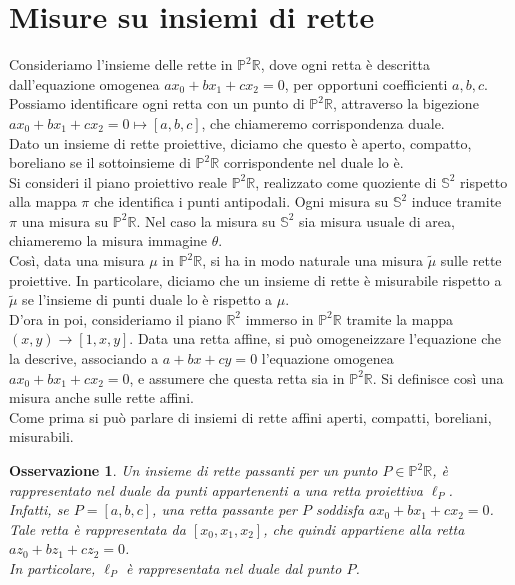 \documentclass[a4paper, twoside,openright]{article}
\newcommand{\ra}{\rightarrow}
\newcommand{\R}{\mathbb{R}}
\renewcommand{\P}{\mathbb{P}}
\renewcommand{\S}{\mathbb{S}}
\newcommand{\<}{\langle}
\renewcommand{\>}{\rangle}
\newtheorem{oss}[teo]{Osservazione}
\begin{document}
	\newpage


\section{Misure su insiemi di rette}
Consideriamo l'insieme delle rette in $\P^2 \R$, dove ogni retta è descritta dall'equazione omogenea $ax_0+bx_1+cx_2=0$, per opportuni coefficienti $a,b,c$.\\
Possiamo identificare ogni retta con un punto di $\P^2 \R$, attraverso la bigezione $ax_0+bx_1+cx_2=0 \mapsto [a,b,c]$, che chiameremo corrispondenza duale.\\
Dato un insieme di rette proiettive, diciamo che questo è aperto, compatto, boreliano se il sottoinsieme di $\P^2 \R$ corrispondente nel duale lo è.\\

Si consideri il piano proiettivo reale $\P^2 \R$, realizzato come quoziente di $\S^2$ rispetto alla mappa $\pi$ che identifica i punti antipodali. Ogni misura su $\S^2$ induce tramite $\pi$ una misura su $\P^2\R$. Nel caso la misura su $\S^2$ sia misura usuale di area, chiameremo la misura immagine $\theta$.\\
Così, data una misura $\mu$ in $\P^2 \R$, si ha in modo naturale una misura $\tilde \mu$ sulle rette proiettive. In particolare, diciamo che un insieme di rette è misurabile rispetto a $\tilde \mu$ se l'insieme di punti duale lo è rispetto a $\mu$.\\

D'ora in poi, consideriamo il piano $\R^2$ immerso in $\P^2 \R$ tramite la mappa $(x,y) \ra [1,x,y]$. Data una retta affine, si può omogeneizzare l'equazione che la descrive, associando a $a+bx+cy=0$ l'equazione omogenea $ax_0+bx_1+cx_2=0$, e assumere che questa retta sia in $\P^2 \R$. Si definisce così una misura anche sulle rette affini.\\
Come prima si può parlare di insiemi di rette affini aperti, compatti, boreliani, misurabili.

\begin{oss}
	\label{osservazione}
	Un insieme di rette passanti per un punto $P \in \P^2 \R$, è rappresentato nel duale da punti appartenenti a una retta proiettiva $\ell_P$.\\
	Infatti, se $P=[a,b,c]$, una retta passante per $P$ soddisfa $ax_0+bx_1+cx_2=0$. Tale retta è rappresentata da $[x_0,x_1,x_2]$, che quindi appartiene alla retta $az_0+bz_1+cz_2=0$.\\
	In particolare, $\ell_P$ è rappresentata nel duale dal punto $P$.
\end{oss}
\end{document}
